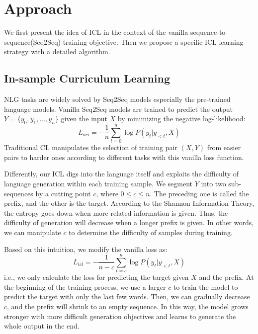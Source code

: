 \section{Approach}
\label{sec:approach}
We first present the idea of ICL in the context of the
vanilla sequence-to-sequence(Seq2Seq) training objective. 
Then we propose a specific ICL learning strategy with 
a detailed algorithm.

\subsection{In-sample Curriculum Learning}

NLG tasks are widely solved by Seq2Seq models especially the pre-trained language models. Vanilla Seq2Seq models are trained to predict the output $Y=\{y_0, y_1, ..., y_n\}$ given the input $X$ by minimizing the negative log-likelihood:
\begin{equation}
L_{ori} = -\frac{1}{n}\sum_{t=0}^{n}\log P(y_t|y_{<t}, X)
\end{equation}
Traditional CL manipulates the selection of training pair $(X, Y)$ from easier pairs to harder ones according to different tasks with this vanilla loss function.

Differently, our ICL digs into the language itself and exploits the difficulty of language generation within each training sample.
We segment $Y$ into two sub-sequences by a cutting point $c$, where $0\leq c\leq n$. The preceding one is called the prefix, and the other is the target. 
According to the Shannon Information Theory, the entropy goes down when more related information is given. 
Thus, the difficulty of generation will decrease when a longer prefix is given. In other words, we can manipulate $c$ to determine the difficulty of samples during training.

Based on this intuition, we modify the vanilla loss as:
\begin{equation}
	L_{icl} = -\frac{1}{n-c}\sum_{t=c}^{n}\log P(y_t|y_{<t}, X)
	\label{eq:icl}
\end{equation}
i.e., we only calculate the loss for predicting the target given $X$ and the prefix.
At the beginning of the training process, we use a larger $c$ to train the model to predict the target with only the last few words.
Then, we can gradually decrease $c$, and the prefix will shrink to an empty sequence.
In this way, the model grows stronger with more difficult generation objectives and learns to generate the whole output in the end.

